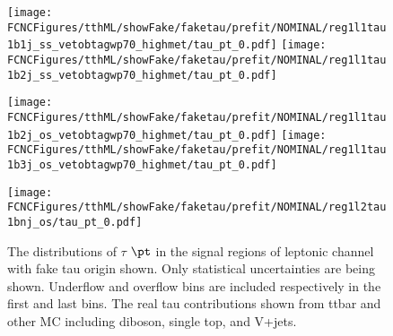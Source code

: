 \begin{figure}[H]
\centering
\texttt{[image: \\FCNCFigures/tthML/showFake/faketau/prefit/NOMINAL/reg1l1tau1b1j\_ss\_vetobtagwp70\_highmet/tau\_pt\_0.pdf]}
\texttt{[image: \\FCNCFigures/tthML/showFake/faketau/prefit/NOMINAL/reg1l1tau1b2j\_ss\_vetobtagwp70\_highmet/tau\_pt\_0.pdf]}

\texttt{[image: \\FCNCFigures/tthML/showFake/faketau/prefit/NOMINAL/reg1l1tau1b2j\_os\_vetobtagwp70\_highmet/tau\_pt\_0.pdf]}
\texttt{[image: \\FCNCFigures/tthML/showFake/faketau/prefit/NOMINAL/reg1l1tau1b3j\_os\_vetobtagwp70\_highmet/tau\_pt\_0.pdf]}

\texttt{[image: \\FCNCFigures/tthML/showFake/faketau/prefit/NOMINAL/reg1l2tau1bnj\_os/tau\_pt\_0.pdf]}
\caption{ The distributions of $\tau$ $\pt$ in the signal regions of leptonic channel with fake tau origin shown. Only statistical uncertainties are being shown. Underflow and overflow bins are included respectively in the first and last bins. The real tau contributions shown from ttbar and other MC including diboson, single top, and V+jets.}
\label{fig:wjet_pt}
\end{figure}
